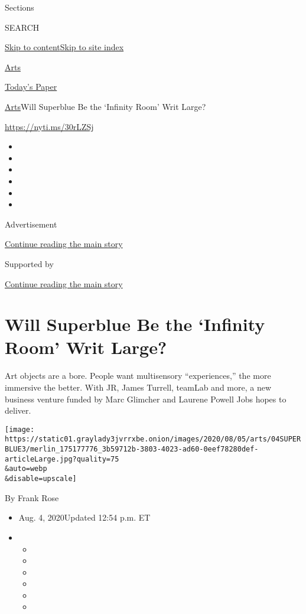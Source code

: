 Sections

SEARCH

\protect\hyperlink{site-content}{Skip to
content}\protect\hyperlink{site-index}{Skip to site index}

\href{https://www.nytimes3xbfgragh.onion/section/arts}{Arts}

\href{https://myaccount.nytimes3xbfgragh.onion/auth/login?response_type=cookie\&client_id=vi}{}

\href{https://www.nytimes3xbfgragh.onion/section/todayspaper}{Today's
Paper}

\href{/section/arts}{Arts}\textbar{}Will Superblue Be the `Infinity
Room' Writ Large?

\url{https://nyti.ms/30rLZSj}

\begin{itemize}
\item
\item
\item
\item
\item
\item
\end{itemize}

Advertisement

\protect\hyperlink{after-top}{Continue reading the main story}

Supported by

\protect\hyperlink{after-sponsor}{Continue reading the main story}

\hypertarget{will-superblue-be-the-infinity-room-writ-large}{%
\section{Will Superblue Be the `Infinity Room' Writ
Large?}\label{will-superblue-be-the-infinity-room-writ-large}}

Art objects are a bore. People want multisensory ``experiences,'' the
more immersive the better. With JR, James Turrell, teamLab and more, a
new business venture funded by Marc Glimcher and Laurene Powell Jobs
hopes to deliver.

\texttt{[image: https://static01.graylady3jvrrxbe.onion/images/2020/08/05/arts/04SUPERBLUE3/merlin\_175177776\_3b59712b-3803-4023-ad60-0eef78280def-articleLarge.jpg?quality=75\\\&auto=webp\\\&disable=upscale]}

By Frank Rose

\begin{itemize}
\item
  Aug. 4, 2020Updated 12:54 p.m. ET
\item
  \begin{itemize}
  \item
  \item
  \item
  \item
  \item
  \item
  \end{itemize}
\end{itemize}

